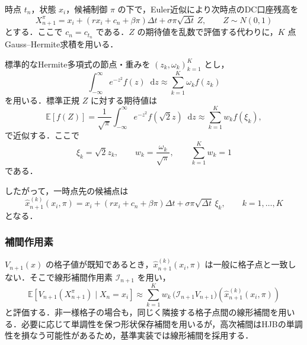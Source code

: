 \documentclass[10pt,a4paper]{article}
\theoremstyle{plain}
\theoremstyle{definition}
\newcommand{\E}{\mathbb{E}}
\newcommand{\dd}{\mathop{}\!\mathrm{d}}
\begin{document}
時点 $t_n$，状態 $x_i$，候補制御 $\pi$ の下で，Euler近似により次時点のDC口座残高を
\begin{equation}
  X_{n+1}^{\pi}
  =x_i+(rx_i+c_n+\beta\pi)\Delta t+\sigma\pi\sqrt{\Delta t}\,Z,
  \qquad Z\sim N(0,1)
  \label{eq:euler-transition}
\end{equation}
とする．ここで $c_n=c_{t_n}$ である．$Z$ の期待値を乱数で評価する代わりに，$K$ 点Gauss--Hermite求積を用いる．

標準的なHermite多項式の節点・重みを $(z_k,\omega_k)_{k=1}^K$ とし，
\begin{equation}
  \int_{-\infty}^{\infty} e^{-z^2}f(z)\dd z
  \approx
  \sum_{k=1}^K\omega_k f(z_k)
  \label{eq:gh-basic}
\end{equation}
を用いる．標準正規 $Z$ に対する期待値は
\begin{equation}
  \E[f(Z)]
  =\frac{1}{\sqrt{\pi}}\int_{-\infty}^{\infty}e^{-z^2}f(\sqrt{2}z)\dd z
  \approx
  \sum_{k=1}^K w_k f(\xi_k),
  \label{eq:gh-normal}
\end{equation}
で近似する．ここで
\begin{equation}
  \xi_k=\sqrt{2}z_k,
  \qquad
  w_k=\frac{\omega_k}{\sqrt{\pi}},
  \qquad
  \sum_{k=1}^K w_k=1
  \label{eq:gh-nodes}
\end{equation}
である．

したがって，一時点先の候補点は
\begin{equation}
  \widehat{x}_{n+1}^{(k)}(x_i,\pi)
  =x_i+(rx_i+c_n+\beta\pi)\Delta t
  +\sigma\pi\sqrt{\Delta t}\,\xi_k,
  \qquad k=1,\ldots,K
  \label{eq:transition-gh-nodes}
\end{equation}
となる．

\subsubsection{補間作用素}

$V_{n+1}(x)$ の格子値が既知であるとき，$\widehat{x}_{n+1}^{(k)}(x_i,\pi)$ は一般に格子点と一致しない．そこで線形補間作用素 $\mathcal I_{n+1}$ を用い，
\begin{equation}
  \E\left[V_{n+1}(X_{n+1}^{\pi})\mid X_n=x_i\right]
  \approx
  \sum_{k=1}^K w_k\,
  \bigl(\mathcal I_{n+1}V_{n+1}\bigr)
  \left(\widehat{x}_{n+1}^{(k)}(x_i,\pi)\right)
  \label{eq:gh-expectation}
\end{equation}
と評価する．非一様格子の場合も，同じく隣接する格子点間の線形補間を用いる．必要に応じて単調性を保つ形状保存補間を用いるが，高次補間はHJBの単調性を損なう可能性があるため，基準実装では線形補間を採用する．
\end{document}
